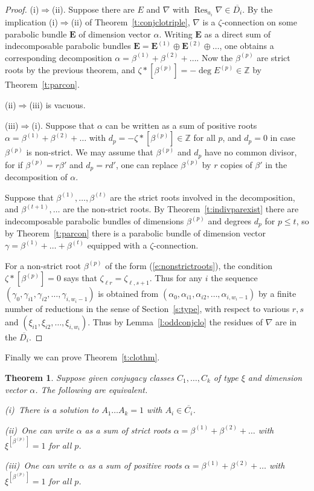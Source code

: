 \documentclass{amsart}
\theoremstyle{plain}
\newtheorem{thm}{Theorem}[section]
\theoremstyle{definition}
\theoremstyle{remark}
\newcommand{\Z}{\mathbb{Z}}
\DeclareMathOperator{\Res}{Res}
\newcommand{\E}{\mathbf{E}}
\begin{document}
\begin{proof}
(i)$\Rightarrow$(ii).
Suppose there are $E$ and $\nabla$ with $\Res_{a_i}\nabla \in \overline{D_i}$.
By the implication (i)$\Rightarrow$(ii) of Theorem~\ref{t:conjclotriple},
$\nabla$ is a $\zeta$-connection on some parabolic bundle $\E$ of dimension vector $\alpha$.
Writing $\E$ as a direct sum of indecomposable parabolic bundles
$\E = \E^{(1)}\oplus \E^{(2)}\oplus \dots$,
one obtains a corresponding decomposition $\alpha=\beta^{(1)}+\beta^{(2)}+\dots$.
Now the $\beta^{(p)}$ are strict roots by the previous theorem, and
$\zeta*[\beta^{(p)}] = -\deg E^{(p)} \in\Z$ by Theorem~\ref{t:parcon}.

(ii)$\Rightarrow$(iii) is vacuous.

(iii)$\Rightarrow$(i).
Suppose that $\alpha$ can be written
as a sum of positive roots $\alpha=\beta^{(1)}+\beta^{(2)}+\dots$ with
$d_p=-\zeta*[\beta^{(p)}]\in\Z$ for all $p$, and $d_p=0$ in case $\beta^{(p)}$ is non-strict.
We may assume that $\beta^{(p)}$ and $d_p$ have no common divisor, for if
$\beta^{(p)}=r\beta'$ and $d_p=rd'$, one can replace $\beta^{(p)}$ by $r$
copies of $\beta'$ in the decomposition of $\alpha$.

Suppose that $\beta^{(1)},\dots,\beta^{(t)}$ are the strict roots involved in
the decomposition, and $\beta^{(t+1)},\dots$ are the non-strict roots.
By Theorem~\ref{t:indivparexist} there are indecomposable parabolic bundles of
dimensions $\beta^{(p)}$ and degrees $d_p$ for $p\le t$,
so by Theorem~\ref{t:parcon} there is a parabolic bundle of dimension
vector $\gamma = \beta^{(1)}+\dots+\beta^{(t)}$ equipped with
a $\zeta$-connection.

For a non-strict root $\beta^{(p)}$ of the form (\ref{e:nonstrictroots}),
the condition $\zeta*[\beta^{(p)}]=0$ says that $\zeta_{\ell r} = \zeta_{\ell,s+1}$.
Thus for any $i$ the sequence
$(\gamma_0,\gamma_{i1},\gamma_{i2},\dots,\gamma_{i,w_i-1})$
is obtained from
$(\alpha_0,\alpha_{i1},\alpha_{i2},\dots,\alpha_{i,w_i-1})$
by a finite number of reductions in the sense of Section~\ref{s:type}, with respect to
various $r,s$ and $(\xi_{i1},\xi_{i2},\dots,\xi_{i,w_i})$.
Thus by Lemma~\ref{l:oddconjclo} the residues of $\nabla$ are in the $\overline{D_i}$.
\end{proof}


Finally we can prove Theorem~\ref{t:clothm}.


\begin{thm}
Suppose given conjugacy classes $C_1,\dots,C_k$ of type $\xi$ and dimension vector $\alpha$.
The following are equivalent.

\textup{\hphantom{ii}(i)}~There is a solution to $A_1\dots A_k = 1$ with $A_i\in\overline{C_i}$.

\textup{\hphantom{i}(ii)}~One can write $\alpha$ as a sum of strict roots $\alpha=\beta^{(1)}+\beta^{(2)}+\dots$ with
$\xi^{[\beta^{(p)}]}=1$ for all $p$.

\textup{(iii)}~One can write $\alpha$ as a sum of positive roots $\alpha=\beta^{(1)}+\beta^{(2)}+\dots$ with
$\xi^{[\beta^{(p)}]}=1$ for all $p$.
\end{thm}
\end{document}
